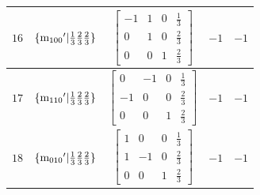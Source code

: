 \documentclass[fleqn,8pt]{jsarticle}
\begin{document}
\begin{longtable}{ccccc}
$ 16 $ & $ \{{\rm m}_{100}{}'|\frac{1}{3} \frac{2}{3} \frac{2}{3}\} $ & $ \begin{bmatrix} -1 & 1 & 0 & \frac{1}{3} \\ 0 & 1 & 0 & \frac{2}{3} \\ 0 & 0 & 1 & \frac{2}{3} \end{bmatrix} $ & $ -1 $ & $ -1 $ \\ \hline
$ 17 $ & $ \{{\rm m}_{110}{}'|\frac{1}{3} \frac{2}{3} \frac{2}{3}\} $ & $ \begin{bmatrix} 0 & -1 & 0 & \frac{1}{3} \\ -1 & 0 & 0 & \frac{2}{3} \\ 0 & 0 & 1 & \frac{2}{3} \end{bmatrix} $ & $ -1 $ & $ -1 $ \\ \hline
$ 18 $ & $ \{{\rm m}_{010}{}'|\frac{1}{3} \frac{2}{3} \frac{2}{3}\} $ & $ \begin{bmatrix} 1 & 0 & 0 & \frac{1}{3} \\ 1 & -1 & 0 & \frac{2}{3} \\ 0 & 0 & 1 & \frac{2}{3} \end{bmatrix} $ & $ -1 $ & $ -1 $ \\
\end{longtable}
\end{document}
